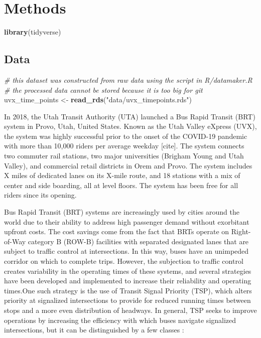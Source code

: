 \documentclass[]{elsarticle} %
\newenvironment{Shaded}{\begin{snugshade}}{\end{snugshade}}
\newcommand{\CommentTok}[1]{\textcolor[rgb]{0.56,0.35,0.01}{\textit{#1}}}
\newcommand{\KeywordTok}[1]{\textcolor[rgb]{0.13,0.29,0.53}{\textbf{#1}}}
\newcommand{\NormalTok}[1]{#1}
\newcommand{\StringTok}[1]{\textcolor[rgb]{0.31,0.60,0.02}{#1}}
\begin{document}
\hypertarget{methods}{%
\section{Methods}\label{methods}}

\begin{Shaded}
\begin{Highlighting}[]
\KeywordTok{library}\NormalTok{(tidyverse)}
\end{Highlighting}
\end{Shaded}

\hypertarget{data}{%
\subsection{Data}\label{data}}

\begin{Shaded}
\begin{Highlighting}[]
\CommentTok{# this dataset was constructed from raw data using the script in R/datamaker.R}
\CommentTok{# the processed data cannot be stored because it is too big for git}
\NormalTok{uvx_time_points <-}\StringTok{ }\KeywordTok{read_rds}\NormalTok{(}\StringTok{"data/uvx_timepoints.rds"}\NormalTok{)}
\end{Highlighting}
\end{Shaded}

In 2018, the Utah Transit Authority (UTA) launched a Bus Rapid Transit (BRT)
system in Provo, Utah, United States. Known as the Utah Valley eXpress (UVX),
the system was highly successful prior to the onset of the COVID-19 pandemic
with more than 10,000 riders per average weekday {[}cite{]}. The system connects
two commuter rail stations, two major universities (Brigham Young and Utah Valley),
and commercial retail districts in Orem and Provo. The system includes X miles of
dedicated lanes on its X-mile route, and 18 stations with a mix of center and side
boarding, all at level floors. The system has been free for all riders since its
opening.

Bus Rapid Transit (BRT) systems are increasingly used by cities around the world
due to their ability to address high passenger demand without exorbitant upfront
costs. The cost savings come from the fact that BRTs operate on Right-of-Way
category B (ROW-B) facilities with separated designated lanes that are subject
to traffic control at intersections. In this way, buses have an unimpeded
corridor on which to complete trips. However, the subjection to traffic control
creates variability in the operating times of these systems, and several
strategies have been developed and implemented to increase their reliability and
operating times.One such strategy is the use of Transit Signal Priority (TSP),
which alters priority at signalized intersections to provide for reduced running
times between stops and a more even distribution of headways. In general, TSP
seeks to improve operations by increasing the efficiency with which buses
navigate signalized intersections, but it can be distinguished by a few classes
\citep{DELGADO201528}:
\end{document}
